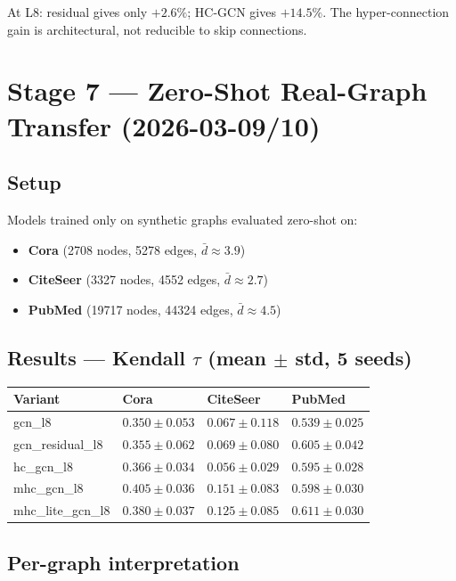 \documentclass[11pt,a4paper]{article}
\begin{document}
At L8: residual gives only $+2.6\%$; HC-GCN gives $+14.5\%$.
The hyper-connection gain is architectural, not reducible to
skip connections.

\section{Stage 7 --- Zero-Shot Real-Graph Transfer (2026-03-09/10)}

\subsection{Setup}
Models trained only on synthetic graphs evaluated zero-shot on:
\begin{itemize}[noitemsep]
  \item \textbf{Cora} (2708 nodes, 5278 edges, $\bar{d}\approx3.9$)
  \item \textbf{CiteSeer} (3327 nodes, 4552 edges, $\bar{d}\approx2.7$)
  \item \textbf{PubMed} (19717 nodes, 44324 edges, $\bar{d}\approx4.5$)
\end{itemize}

\subsection{Results --- Kendall $\tau$ (mean $\pm$ std, 5 seeds)}
\begin{table}[h]
\centering
\begin{tabular}{L{3.8cm} R{3cm} R{3cm} R{3cm}}
\toprule
Variant & Cora & CiteSeer & PubMed \\
\midrule
gcn\_l8            & $0.350\pm0.053$ & $0.067\pm0.118$ & $0.539\pm0.025$ \\
gcn\_residual\_l8  & $0.355\pm0.062$ & $0.069\pm0.080$ & $0.605\pm0.042$ \\
hc\_gcn\_l8        & $0.366\pm0.034$ & $0.056\pm0.029$ & $0.595\pm0.028$ \\
mhc\_gcn\_l8       & $\mathbf{0.405\pm0.036}$ & $\mathbf{0.151\pm0.083}$ & $0.598\pm0.030$ \\
mhc\_lite\_gcn\_l8 & $0.380\pm0.037$ & $0.125\pm0.085$ & $\mathbf{0.611\pm0.030}$ \\
\bottomrule
\end{tabular}
\end{table}

\subsection{Per-graph interpretation}
\end{document}
